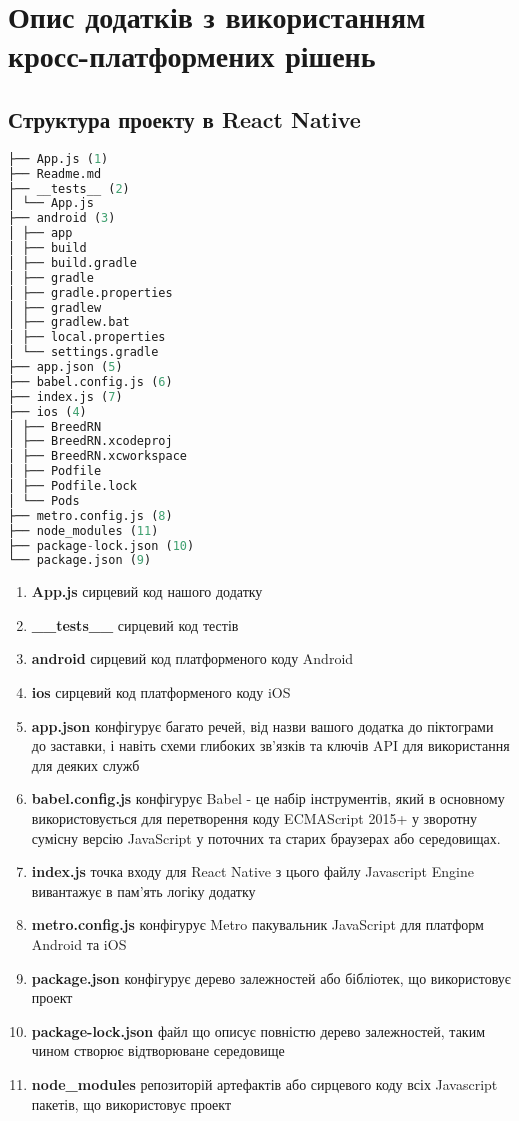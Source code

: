 \chapter{Опис додатків з використанням кросс-платформених рішень}
\label{ch2}


\section{Структура проекту в React Native}
\label{sec:rn_structure_app}

\begin{lstlisting}[style=light, language=Python,label={lst:rn_app_structure},caption=React Native App Layout]
├── App.js (1)
├── Readme.md
├── __tests__ (2)
│ └── App.js
├── android (3)
│ ├── app
│ ├── build
│ ├── build.gradle
│ ├── gradle
│ ├── gradle.properties
│ ├── gradlew
│ ├── gradlew.bat
│ ├── local.properties
│ └── settings.gradle
├── app.json (5)
├── babel.config.js (6)
├── index.js (7)
├── ios (4)
│ ├── BreedRN
│ ├── BreedRN.xcodeproj
│ ├── BreedRN.xcworkspace
│ ├── Podfile
│ ├── Podfile.lock
│ └── Pods
├── metro.config.js (8)
├── node_modules (11)
├── package-lock.json (10)
└── package.json (9)
\end{lstlisting}

\begin{enumerate}
    \item \textbf{App.js} сирцевий код нашого додатку
    \item \textbf{\_\_tests\_\_} сирцевий код тестів
    \item \textbf{android} сирцевий код платформеного коду Android
    \item \textbf{ios} сирцевий код платформеного коду iOS
    \item \textbf{app.json} конфігурує багато речей, від назви вашого додатка до піктограми до заставки, і навіть схеми глибоких зв’язків та ключів API для використання для деяких служб
    \item \textbf{babel.config.js} конфігурує Babel - це набір інструментів, який в основному використовується для перетворення коду ECMAScript 2015+ у зворотну сумісну версію JavaScript у поточних та старих браузерах або середовищах.
    \item \textbf{index.js} точка входу для React Native з цього файлу Javascript Engine вивантажує в пам'ять логіку додатку
    \item \textbf{metro.config.js} конфігурує Metro пакувальник JavaScript для платформ Android та iOS
    \item \textbf{package.json} конфігурує дерево залежностей або бібліотек, що використовує проект
    \item \textbf{package-lock.json} файл що описує повністю дерево залежностей, таким чином створює відтворюване середовище
    \item \textbf{node\_modules} репозиторій артефактів або сирцевого коду всіх Javascript пакетів, що використовує проект
\end{enumerate}


